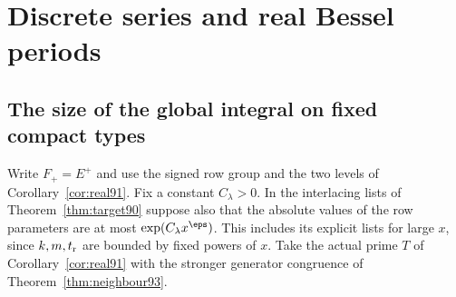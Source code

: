\documentclass[a4paper,11pt]{article}
\theoremstyle{definition}
\theoremstyle{remark}
\numberwithin{equation}{section}
\begin{document}
\section{Discrete series and real Bessel periods}\label{nav:g-VII-1}

\subsection{The size of the global integral on fixed compact types}\label{nav:VII-17}
Write \(F_+=E^+\) and use the signed row group and the two levels of
Corollary~\ref{cor:real91}. Fix a constant \(C_\lambda>0\). In the
interlacing lists of Theorem~\ref{thm:target90} suppose also that
the absolute values of the row parameters are at most
\(\exp(C_\lambda x^\eps)\). This includes its explicit lists for
large \(x\), since \(k,m,t_{\rm r}\) are bounded by fixed powers
of \(x\). Take the actual prime \(T\) of Corollary~\ref{cor:real91}
with the stronger generator congruence of Theorem~\ref{thm:neighbour93}.
\end{document}
